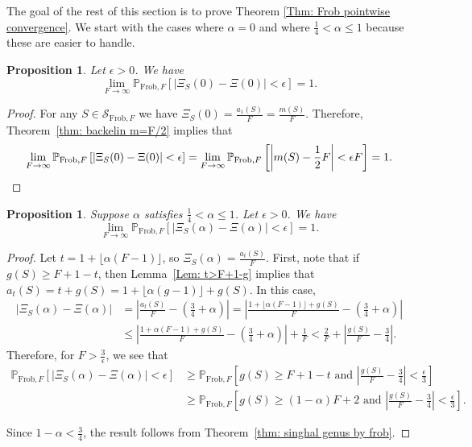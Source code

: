 \documentclass[12pt]{amsart}
\renewcommand{\P}{\mathbb{P}}
\def\SS{{\mathcal S}}
\newcommand{\Frob}{\text{Frob}}
\newtheorem{proposition}[theorem]{Proposition}
\begin{document}
The goal of the rest of this section is to prove Theorem \ref{Thm: Frob pointwise convergence}. We start with the cases where $\alpha=0$ and where $\frac{1}{4}<\alpha\leq 1$ because these are easier to handle.


\begin{proposition}\label{Prop: Frob pointwise alpha 0}
Let $\epsilon>0$.  We have
\[
\lim_{F\to\infty} \P_{\Frob,F}[ |\Xi_S(0) -\Xi(0)|<\epsilon ] =1.
\]
\end{proposition}
\begin{proof}
For any $S \in \SS_{\Frob,F}$ we have $\Xi_S(0) = \frac{a_{1}(S)}{F} = \frac{m(S)}{F}$. Therefore, Theorem~\ref{thm: backelin m=F/2} implies that
\[
\lim_{F\to\infty} \P_{\Frob,F}\left[ \left|\Xi_S(0) -\Xi(0)\right|<\epsilon \right]
=\lim_{F\to\infty} \P_{\Frob,F}\left[ \left|m(S) -\frac{1}{2} F\right|<\epsilon F \right]=1. \qedhere
\]
\end{proof}


\begin{proposition}\label{Prop: Frob pointwise large alpha}
Suppose $\alpha$ satisfies $\frac{1}{4}<\alpha\leq 1$.  Let $\epsilon>0$.  We have
\[
\lim_{F\to\infty} \P_{\Frob,F}[ |\Xi_S(\alpha) -\Xi(\alpha)|<\epsilon ] =1.
\]
\end{proposition}
\begin{proof}
Let $t=1+\lfloor\alpha (F-1)\rfloor$, so $\Xi_S(\alpha)= \frac{a_{t}(S)}{F}$. First, note that if $g(S)\geq F+1-t$, then Lemma~\ref{Lem: t>F+1-g} implies that $a_t(S) = t + g(S) = 1+\lfloor \alpha(g-1)\rfloor + g(S)$.  In this case,
\begin{align*}
|\Xi_S(\alpha) -\Xi(\alpha)|
&=\left|\frac{a_t(S)}{F} - \left(\frac{3}{4}+\alpha\right)\right|
= \left|\frac{1+\lfloor\alpha (F-1)\rfloor +g(S)}{F} - \left(\frac{3}{4}+\alpha\right)\right|\\
&\leq \left|\frac{1+\alpha (F-1) +g(S)}{F} - \left(\frac{3}{4}+\alpha\right)\right| +\frac{1}{F} 
<\frac{2}{F} +\left|\frac{g(S)}{F} - \frac{3}{4}\right|.
\end{align*}
Therefore, for $F>\frac{3}{\epsilon}$, we see that
\begin{align*}
\P_{\Frob,F}[ |\Xi_S(\alpha) -\Xi(\alpha)|<\epsilon ]
&\geq \P_{\Frob,F}\left[g(S)\geq F+1-t \text{ and } \left|\frac{g(S)}{F} - \frac{3}{4}\right| <\frac{\epsilon}{3} \right]\\
&\geq \P_{\Frob,F}\left[g(S)\geq (1-\alpha)F+2 \text{ and } \left|\frac{g(S)}{F} - \frac{3}{4}\right| <\frac{\epsilon}{3} \right].
\end{align*}

Since $1-\alpha<\frac{3}{4}$, the result follows from Theorem~\ref{thm: singhal genus by frob}.
\end{proof}
\end{document}
